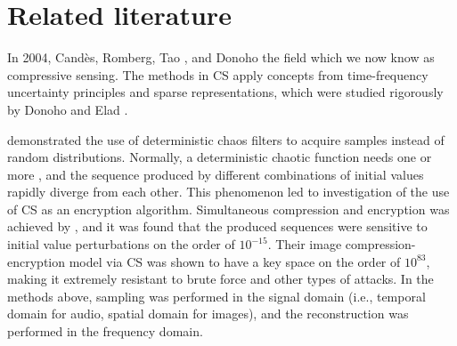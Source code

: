 \section{Related literature}
\label{sec:rrl}
In 2004, Cand\`{e}s, Romberg, Tao \cite{Candes2006}, and Donoho \cite{Donoho2006}  the field which we now know as compressive sensing. The methods in CS apply concepts from time-frequency uncertainty principles \cite{Donoho2001} and sparse representations, which were studied rigorously by Donoho and Elad \cite{Donoho2003}. 

 \cite{LinhTrung2008} demonstrated the use of deterministic chaos filters to acquire samples instead of random distributions.  Normally, a deterministic chaotic function needs one or more , and the sequence  produced by different combinations of initial values rapidly diverge from each other. This phenomenon led to investigation of the use of CS as an encryption algorithm. Simultaneous compression and encryption was achieved by \cite{Zhou2016}, and it was found that the produced sequences were sensitive to initial value perturbations on the order of $10^{-15}$. Their image compression-encryption model via CS was shown to have a key space on the order of $10^{83}$, making it extremely resistant to brute force and other types of attacks.  In the methods above,  sampling was performed in the signal domain (i.e., temporal domain for audio, spatial domain for images), and the reconstruction was performed in the frequency domain.

